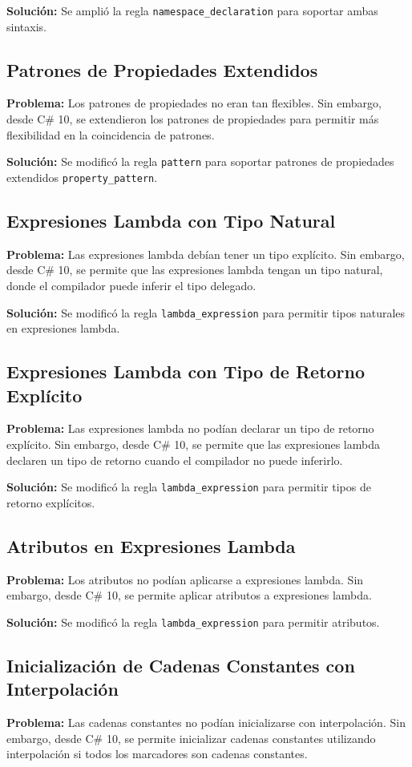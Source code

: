 \textbf{Solución:} Se amplió la regla \texttt{namespace\_declaration} para soportar ambas sintaxis.

\subsection*{Patrones de Propiedades Extendidos}
\textbf{Problema:} Los patrones de propiedades no eran tan flexibles. Sin embargo, desde C\# 10, se extendieron los patrones de propiedades para permitir más flexibilidad en la coincidencia de patrones.

\textbf{Solución:} Se modificó la regla \texttt{pattern} para soportar patrones de propiedades extendidos \texttt{property\_pattern}.

\subsection*{Expresiones Lambda con Tipo Natural}
\textbf{Problema:} Las expresiones lambda debían tener un tipo explícito. Sin embargo, desde C\# 10, se permite que las expresiones lambda tengan un tipo natural, donde el compilador puede inferir el tipo delegado.

\textbf{Solución:} Se modificó la regla \texttt{lambda\_expression} para permitir tipos naturales en expresiones lambda.

\subsection*{Expresiones Lambda con Tipo de Retorno Explícito}
\textbf{Problema:} Las expresiones lambda no podían declarar un tipo de retorno explícito. Sin embargo, desde C\# 10, se permite que las expresiones lambda declaren un tipo de retorno cuando el compilador no puede inferirlo.

\textbf{Solución:} Se modificó la regla \texttt{lambda\_expression} para permitir tipos de retorno explícitos.

\subsection*{Atributos en Expresiones Lambda}
\textbf{Problema:} Los atributos no podían aplicarse a expresiones lambda. Sin embargo, desde C\# 10, se permite aplicar atributos a expresiones lambda.

\textbf{Solución:} Se modificó la regla \texttt{lambda\_expression} para permitir atributos.

\subsection*{Inicialización de Cadenas Constantes con Interpolación}
\textbf{Problema:} Las cadenas constantes no podían inicializarse con interpolación. Sin embargo, desde C\# 10, se permite inicializar cadenas constantes utilizando interpolación si todos los marcadores son cadenas constantes.

